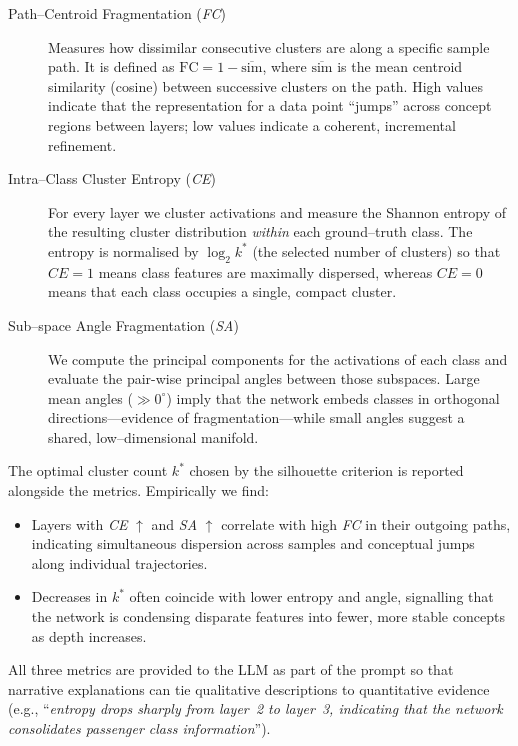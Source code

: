 \begin{description}
    \item[Path--Centroid Fragmentation (\textit{FC})]  Measures how
    dissimilar consecutive clusters are along a specific sample path.
    It is defined as $\mathrm{FC}=1-\overline{\mathrm{sim}}$, where
    $\overline{\mathrm{sim}}$ is the mean centroid similarity
    (cosine) between successive clusters on the path.  High values
    indicate that the representation for a data point ``jumps'' across
    concept regions between layers; low values indicate a coherent,
    incremental refinement.

    \item[Intra--Class Cluster Entropy (\textit{CE})]  For every
    layer we cluster activations and measure the Shannon entropy of
    the resulting cluster distribution \emph{within} each ground--truth
    class.  The entropy is normalised by $\log_2 k^*$ (the selected
    number of clusters) so that $\textit{CE}=1$ means class features
    are maximally dispersed, whereas $\textit{CE}=0$ means that each
    class occupies a single, compact cluster.

    \item[Sub--space Angle Fragmentation (\textit{SA})]  We compute
    the principal components for the activations of each class and
    evaluate the pair-wise principal angles between those subspaces.
    Large mean angles ($\gg 0^\circ$) imply that the network embeds
    classes in orthogonal directions—evidence of fragmentation—while
    small angles suggest a shared, low–dimensional manifold.
\end{description}

The optimal cluster count $k^*$ chosen by the silhouette criterion is
reported alongside the metrics.  Empirically we find:
\begin{itemize}
    \item Layers with \textit{CE} $\uparrow$ and \textit{SA} $\uparrow$
          correlate with high \textit{FC} in their outgoing paths,
          indicating simultaneous dispersion across samples and
          conceptual jumps along individual trajectories.
    \item Decreases in $k^*$ often coincide with lower entropy and
          angle, signalling that the network is condensing disparate
          features into fewer, more stable concepts as depth
          increases.
\end{itemize}

All three metrics are provided to the LLM as part of the prompt so
that narrative explanations can tie qualitative descriptions to
quantitative evidence (e.g., ``\emph{entropy drops sharply from layer~2
 to layer~3, indicating that the network consolidates passenger class
 information}'').

